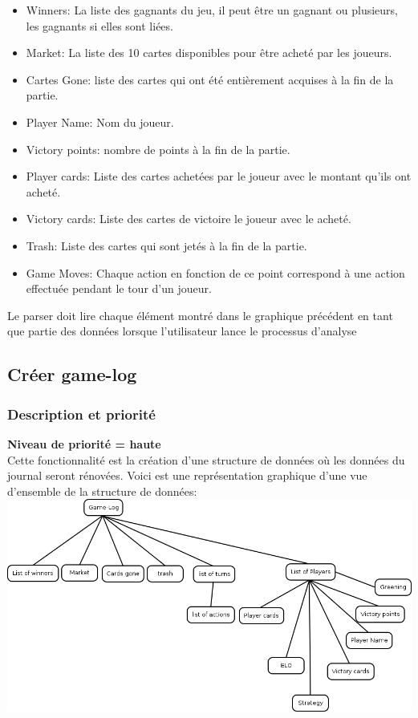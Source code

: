 \documentclass{scrreprt}
\begin{document}
\begin{itemize}
\item Winners: La liste des gagnants du jeu, il peut être un gagnant ou plusieurs, les gagnants si elles sont liées.
\item Market: La liste des 10 cartes disponibles pour être acheté par les joueurs.
\item Cartes Gone: liste des cartes qui ont été entièrement acquises à la fin de la partie.
\item Player Name: Nom du joueur.
\item Victory points: nombre de points à la fin de la partie.
\item Player cards: Liste des cartes achetées par le joueur avec le montant qu'ils ont acheté.
\item Victory cards: Liste des cartes de victoire le joueur avec le acheté.
\item Trash: Liste des cartes qui sont jetés à la fin de la partie.
\item Game Moves: Chaque action en fonction de ce point correspond à une action effectuée pendant le tour d'un joueur.
\end{itemize}
Le parser doit lire chaque élément montré dans le graphique précédent en tant que partie des données lorsque l'utilisateur lance le processus d'analyse\\

\subsection{Créer game-log}
\subsubsection{Description et priorité}
\textbf{Niveau de priorité = haute}\\
Cette fonctionnalité est la création d'une structure de données où les données du journal seront rénovées.
Voici est une représentation graphique d'une vue d'ensemble de la structure de données:\\
\includegraphics[scale=0.5,keepaspectratio]{game-log}
\end{document}
